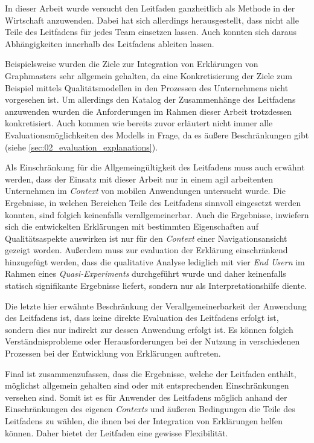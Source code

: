 \smallskip

In dieser Arbeit wurde versucht den Leitfaden ganzheitlich als Methode in der Wirtschaft anzuwenden. Dabei hat sich allerdings herausgestellt, dass nicht alle Teile des Leitfadens für jedes Team einsetzen lassen. Auch konnten sich daraus Abhängigkeiten innerhalb des Leitfadens ableiten lassen.

Beispielsweise wurden die Ziele zur Integration von Erklärungen von Graphmasters sehr allgemein gehalten, da eine Konkretisierung der Ziele zum Beispiel mittels Qualitätsmodellen \cite{schneider2012abenteuer} in den Prozessen des Unternehmens nicht vorgesehen ist. Um allerdings den Katalog der Zusammenhänge des Leitfadens anzuwenden wurden die Anforderungen im Rahmen dieser Arbeit trotzdessen konkretisiert. Auch kommen wie bereits zuvor erläutert nicht immer alle Evaluationsmöglichkeiten des Modells in Frage, da es äußere Beschränkungen gibt (siehe \autoref{sec:02_evaluation_explanations}).

Als Einschränkung für die Allgemeingültigkeit des Leitfadens muss auch erwähnt werden, dass der Einsatz mit dieser Arbeit nur in einem agil arbeitenten Unternehmen im \textit{Context} von mobilen Anwendungen untersucht wurde. Die Ergebnisse, in welchen Bereichen Teile des Leitfadens sinnvoll eingesetzt werden konnten, sind folgich keinenfalls verallgemeinerbar. Auch die Ergebnisse, inwiefern sich die entwickelten Erklärungen mit bestimmten Eigenschaften auf Qualitätsaspekte auswirken ist nur für den \textit{Context} einer Navigationsansicht gezeigt worden. Außerdem muss zur evaluation der Erklärung einschränkend hinzugefügt werden, dass die qualitative Analyse lediglich mit vier \textit{End Usern} im Rahmen eines \textit{Quasi-Experiments} durchgeführt wurde und daher keinenfalls statisch signifikante Ergebnisse liefert, sondern nur als Interpretationshilfe diente.

Die letzte hier erwähnte Beschränkung der Verallgemeinerbarkeit der Anwendung des Leitfadens ist, dass keine direkte Evaluation des Leitfadens erfolgt ist, sondern dies nur indirekt zur dessen Anwendung erfolgt ist. Es können folgich Verständnisprobleme oder Herausforderungen bei der Nutzung in verschiedenen Prozessen bei der Entwicklung von Erklärungen auftreten.

Final ist zusammenzufassen, dass die Ergebnisse, welche der Leitfaden enthält, möglichst allgemein gehalten sind oder mit entsprechenden Einschränkungen versehen sind. Somit ist es für Anwender des Leitfadens möglich anhand der Einschränkungen des eigenen \textit{Contexts} und äußeren Bedingungen die Teile des Leitfadens zu wählen, die ihnen bei der Integration von Erklärungen helfen können. Daher bietet der Leitfaden eine gewisse Flexibilität.